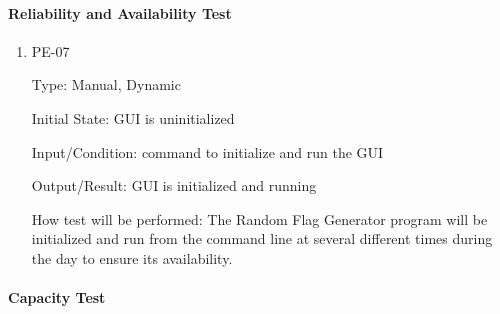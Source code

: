 \documentclass[12pt, titlepage]{article}
\begin{document}
\paragraph{Reliability and Availability Test}

\begin{enumerate}

\item{PE-07\\}

Type: Manual, Dynamic

Initial State: GUI is uninitialized

Input/Condition: command to initialize and run the GUI

Output/Result: GUI is initialized and running

How test will be performed: The Random Flag Generator program will be
initialized and run from the command line at several different times during
the day to ensure its availability.

\end{enumerate}

\paragraph{Capacity Test}
\end{document}
